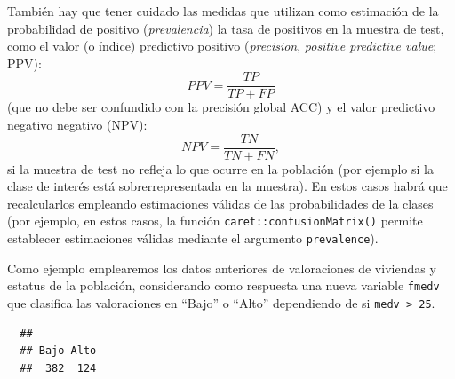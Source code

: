 \documentclass[
]{book}
\newenvironment{Shaded}{\begin{snugshade}}{\end{snugshade}}
\newcommand{\AttributeTok}[1]{\textcolor[rgb]{0.77,0.63,0.00}{#1}}
\newcommand{\CommentTok}[1]{\textcolor[rgb]{0.56,0.35,0.01}{\textit{#1}}}
\newcommand{\ConstantTok}[1]{\textcolor[rgb]{0.00,0.00,0.00}{#1}}
\newcommand{\DecValTok}[1]{\textcolor[rgb]{0.00,0.00,0.81}{#1}}
\newcommand{\FunctionTok}[1]{\textcolor[rgb]{0.00,0.00,0.00}{#1}}
\newcommand{\NormalTok}[1]{#1}
\newcommand{\OtherTok}[1]{\textcolor[rgb]{0.56,0.35,0.01}{#1}}
\newcommand{\SpecialCharTok}[1]{\textcolor[rgb]{0.00,0.00,0.00}{#1}}
\newcommand{\StringTok}[1]{\textcolor[rgb]{0.31,0.60,0.02}{#1}}
\theoremstyle{break}
\theoremstyle{nonumberplain}
\renewcommand{\CommentTok}[1]{\textcolor[rgb]{0.41,0.41,0.41}{\texttt{#1}}}
\begin{document}
También hay que tener cuidado las medidas que utilizan como estimación de la probabilidad de positivo (\emph{prevalencia}) la tasa de positivos en la muestra de test, como el valor (o índice) predictivo positivo (\emph{precision}, \emph{positive predictive value}; PPV): \[PPV = \frac{TP}{TP+FP}\] (que no debe ser confundido con la precisión global ACC) y el valor predictivo negativo negativo (NPV): \[NPV = \frac{TN}{TN+FN},\] si la muestra de test no refleja lo que ocurre en la población (por ejemplo si la clase de interés está sobrerrepresentada en la muestra).
En estos casos habrá que recalcularlos empleando estimaciones válidas de las probabilidades de la clases (por ejemplo, en estos casos, la función \texttt{caret::confusionMatrix()} permite establecer estimaciones válidas mediante el argumento \texttt{prevalence}).

Como ejemplo emplearemos los datos anteriores de valoraciones de viviendas y estatus de la población, considerando como respuesta una nueva variable \texttt{fmedv} que clasifica las valoraciones en ``Bajo'' o ``Alto'' dependiendo de si \texttt{medv\ \textgreater{}\ 25}.

\begin{Shaded}
\end{Shaded}

\begin{verbatim}
  ## 
  ## Bajo Alto 
  ##  382  124
\end{verbatim}

\begin{Shaded}
\end{Shaded}
\end{document}
